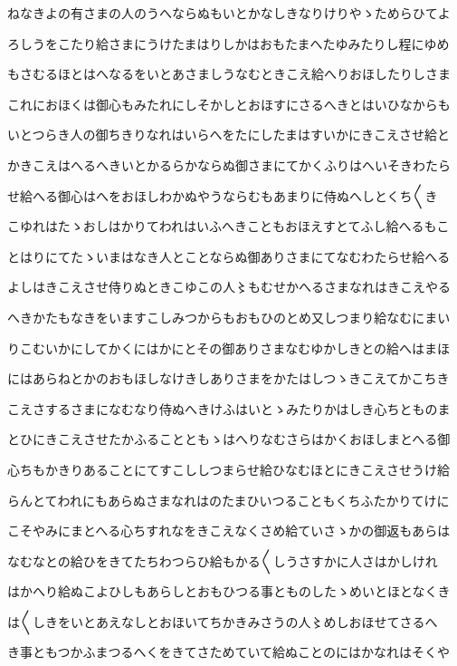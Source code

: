 \documentclass[a4paper,11pt,landscape]{ltjtarticle}
\begin{document}
ねなきよの有さまの人のうへならぬもいとかなしきなりけりやゝためらひてよ
\par\medskip
ろしうをこたり給さまにうけたまはりしかはおもたまへたゆみたりし程にゆめ
\par\medskip
もさむるほとはへなるをいとあさましうなむときこえ給へりおほしたりしさま
\par\medskip
これにおほくは御心もみたれにしそかしとおほすにさるへきとはいひなからも
\par\medskip
いとつらき人の御ちきりなれはいらへをたにしたまはすいかにきこえさせ給と
\par\medskip
かきこえはへるへきいとかるらかならぬ御さまにてかくふりはへいそきわたら
\par\medskip
せ給へる御心はへをおほしわかぬやうならむもあまりに侍ぬへしとくち〱き
\par\medskip
こゆれはたゝおしはかりてわれはいふへきこともおほえすとてふし給へるもこ
\par\medskip
とはりにてたゝいまはなき人とことならぬ御ありさまにてなむわたらせ給へる
\par\medskip
よしはきこえさせ侍りぬときこゆこの人〻もむせかへるさまなれはきこえやる
\par\medskip
へきかたもなきをいますこしみつからもおもひのとめ又しつまり給なむにまい
\par\medskip
りこむいかにしてかくにはかにとその御ありさまなむゆかしきとの給へはまほ
\par\medskip
にはあらねとかのおもほしなけきしありさまをかたはしつゝきこえてかこちき
\par\medskip
こえさするさまになむなり侍ぬへきけふはいとゝみたりかはしき心ちとものま
\par\medskip
とひにきこえさせたかふることともゝはへりなむさらはかくおほしまとへる御
\par\medskip
心ちもかきりあることにてすこししつまらせ給ひなむほとにきこえさせうけ給
\par\medskip
らんとてわれにもあらぬさまなれはのたまひいつることもくちふたかりてけに
\par\medskip
こそやみにまとへる心ちすれなをきこえなくさめ給ていさゝかの御返もあらは
\par\medskip
なむなとの給ひをきてたちわつらひ給もかる〱しうさすかに人さはかしけれ
\par\medskip
はかへり給ぬこよひしもあらしとおもひつる事とものしたゝめいとほとなくき
\par\medskip
は〱しきをいとあえなしとおほいてちかきみさうの人〻めしおほせてさるへ
\par\medskip
き事ともつかふまつるへくをきてさためていて給ぬことのにはかなれはそくや
\end{document}
